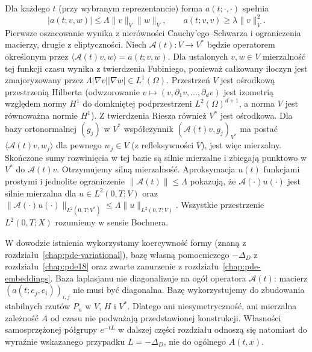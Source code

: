 Dla każdego $t$ (przy wybranym reprezentancie)
forma $a(t;\cdot,\cdot)$ spełnia
\[
 |a(t;v,w)|\le\Lambda\|v\|_V\|w\|_V,\qquad
 a(t;v,v)\ge\lambda\|v\|_V^2.
\]
Pierwsze oszacowanie wynika z nierówności
Cauchy'ego--Schwarza i ograniczenia macierzy, drugie
z eliptyczności. Niech $\mathcal A(t):V\to V^*$ będzie
operatorem określonym przez
$\langle\mathcal A(t)v,w\rangle=a(t;v,w)$.
Dla ustalonych $v,w\in V$ mierzalność tej funkcji czasu
wynika z twierdzenia Fubiniego, ponieważ całkowany
iloczyn jest zmajoryzowany przez
$\Lambda|\nabla v||\nabla w|\in L^1(\Omega)$.
Przestrzeń $V$ jest ośrodkową przestrzenią Hilberta
(odwzorowanie $v\mapsto(v,\partial_1v,\ldots,\partial_dv)$
jest izometrią względem normy $H^1$ do domkniętej
podprzestrzeni $L^2(\Omega)^{d+1}$, a norma $V$
jest równoważna normie $H^1$). Z twierdzenia Riesza
również $V^*$ jest ośrodkowa. Dla bazy ortonormalnej
$(g_j)$ w $V^*$ współczynnik
$(\mathcal A(t)v,g_j)_{V^*}$ ma postać
$\langle\mathcal A(t)v,w_j\rangle$ dla pewnego $w_j\in V$
(z refleksywności $V$), jest więc mierzalny.
Skończone sumy rozwinięcia w tej bazie są silnie
mierzalne i zbiegają punktowo w $V^*$ do
$\mathcal A(t)v$. Otrzymujemy silną mierzalność.
Aproksymacja $u(t)$ funkcjami prostymi i jednolite
ograniczenie $\|\mathcal A(t)\|\le\Lambda$ pokazują,
że $\mathcal A(\cdot)u(\cdot)$ jest silnie mierzalna
dla $u\in L^2(0,T;V)$ oraz
$\|\mathcal A(\cdot)u(\cdot)\|_{L^2(0,T;V^*)}
\le\Lambda\|u\|_{L^2(0,T;V)}$. Wszystkie przestrzenie
$L^2(0,T;X)$ rozumiemy w sensie Bochnera.

\begin{uwaga}
\label{rem:pde-v43-parabolic-basis}
W dowodzie istnienia wykorzystamy koercywność formy
(znaną z rozdziału~\ref{chap:pde-variational}), bazę własną
pomocniczego $-\Delta_D$ z rozdziału~\ref{chap:pde18}
oraz zwarte zanurzenie z rozdziału~\ref{chap:pde-embeddings}.
Baza laplasjanu nie diagonalizuje na ogół operatora
$\mathcal A(t)$: macierz $(a(t;e_j,e_i))_{i,j}$
nie musi być diagonalna. Bazę wykorzystujemy do zbudowania
stabilnych rzutów
$P_n$ w $V$, $H$ i $V^*$. Dlatego ani niesymetryczność,
ani mierzalna zależność $A$ od czasu nie podważają
przedstawionej konstrukcji. Własności samosprzężonej
półgrupy $e^{-tL}$ w dalszej części rozdziału
odnoszą się natomiast do wyraźnie wskazanego przypadku
$L=-\Delta_D$, nie do ogólnego $A(t,x)$.
\end{uwaga}

